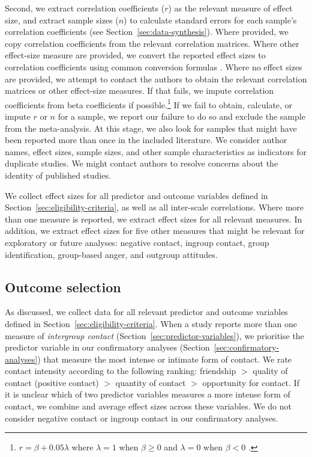 \documentclass[10pt, a4paper]{article}
\begin{document}

Second, we extract correlation coefficients ($r$) as the relevant measure of effect size, and extract sample sizes ($n$) to calculate standard errors for each sample's correlation coefficients (see Section~\ref{sec:data-synthesis}). Where provided, we copy correlation coefficients from the relevant correlation matrices. Where other effect-size measure are provided, we convert the reported effect sizes to correlation coefficients using common conversion formulas \cite{borenstein_introduction_2009}. Where no effect sizes are provided, we attempt to contact the authors to obtain the relevant correlation matrices or other effect-size measures. If that fails, we impute correlation coefficients from beta coefficients \cite{peterson_beta_2005} if possible.\footnote{$r = \beta + 0.05\lambda$ where $\lambda = 1$ when $\beta \geq 0$ and $\lambda = 0$ when $\beta < 0$ .} If we fail to obtain, calculate, or impute $r$ or $n$ for a sample, we report our failure to do so and exclude the sample from the meta-analysis. At this stage, we also look for samples that might have been reported more than once in the included literature. We consider author names, effect sizes, sample sizes, and other sample characteristics as indicators for duplicate studies. We might contact authors to resolve concerns about the identity of published studies. 

We collect effect sizes for all predictor and outcome variables defined in Section~\ref{sec:eligibility-criteria}, as well as all inter-scale correlations. Where more than one measure is reported, we extract effect sizes for all relevant measures.  In addition, we extract effect sizes for five other measures that might be relevant for exploratory or future analyses: negative contact, ingroup contact, group identification, group-based anger, and outgroup attitudes.

\subsection{Outcome selection}
\label{sec:outcome-selection}

As discussed, we collect data for all relevant predictor and outcome variables defined in Section~\ref{sec:eligibility-criteria}. When a study reports more than one measure of \emph{intergroup contact} (Section~\ref{sec:predictor-variables}), we prioritise the predictor variable in our confirmatory analyses (Section~\ref{sec:confirmatory-analyses}) that measure the most intense or intimate form of contact. We rate contact intensity according to the following ranking: friendship $>$ quality of contact (positive contact) $>$ quantity of contact $>$ opportunity for contact. %
If it is unclear which of two predictor variables measures a more intense form of contact, we combine and average effect sizes across these variables. We do not consider negative contact or ingroup contact in our confirmatory analyses. 
\end{document}
